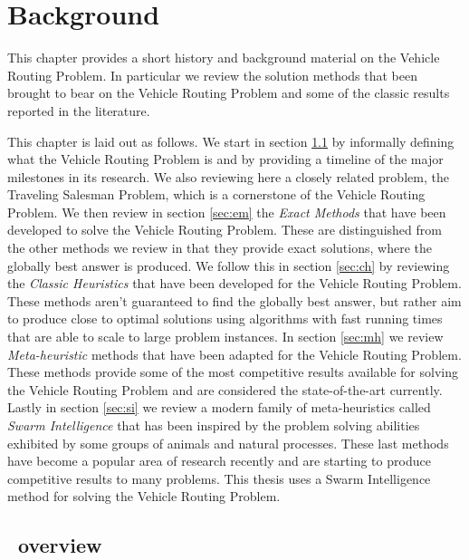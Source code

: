 
\chapter{Background}
This chapter provides a short history and background material on the Vehicle Routing Problem. In particular we review the solution methods that been brought to bear on the Vehicle Routing Problem and some of the classic results reported in the literature. 

This chapter is laid out as follows. We start in section \ref{sec:vo} by informally defining what the Vehicle Routing Problem is and by providing a timeline of the major milestones in its research. We also reviewing here a closely related problem, the Traveling Salesman Problem, which is a cornerstone of the Vehicle Routing Problem. We then review in section \ref{sec:em} the \emph{Exact Methods} that have been developed to solve the Vehicle Routing Problem. These are distinguished from the other methods we review in that they provide exact solutions, where the globally best answer is produced. We follow this in section \ref{sec:ch} by reviewing the \emph{Classic Heuristics} that have been developed for the Vehicle Routing Problem. These methods aren't guaranteed to find the globally best answer, but rather aim to produce close to optimal solutions using algorithms with fast running times that are able to scale to large problem instances. In section \ref{sec:mh} we review \emph{Meta-heuristic} methods that have been adapted for the Vehicle Routing Problem. These methods provide some of the most competitive results available for solving the Vehicle Routing Problem and are considered the state-of-the-art currently. Lastly in section \ref{sec:si} we review a modern family of meta-heuristics called \emph{Swarm Intelligence} that has been inspired by the problem solving abilities exhibited by some groups of animals and natural processes. These last methods have become a popular area of research recently and are starting to produce competitive results to many problems. This thesis uses a Swarm Intelligence method for solving the Vehicle Routing Problem.


\section{\VRP\ overview}
\label{sec:vo}

